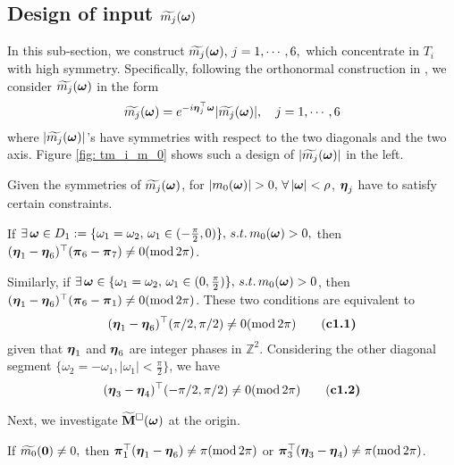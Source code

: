 \subsection{Design of input $\widetilde{m_{j}}(\boldsymbol{\omega})$}\label{sec: phase-design}
In this sub-section, we construct $\widetilde{m_{j}}(\boldsymbol{\omega}),\, j = 1,\cdots,6,$ which concentrate in $T_i$ with high symmetry.
Specifically, following the orthonormal construction in \cite{yin2014orthshear}, we consider $\widetilde{m_{j}}(\boldsymbol{\omega})$ in the form 
\begin{align}\label{eq: m-form}
\widetilde{m_{j}}(\boldsymbol{\omega}) = e^{-i\boldsymbol{\eta}_j^\top\boldsymbol{\omega}}|\widetilde{m_{j}}(\boldsymbol{\omega})|,\quad j = 1,\cdots,6
\end{align}
 where $|\widetilde{m_{j}}(\boldsymbol{\omega})|$'s have symmetries with respect to the two diagonals and the two axis. Figure \ref{fig: tm_i_m_0} shows such a design of $|\widetilde{m_{j}}(\boldsymbol{\omega})|$ in the left.
 
Given the symmetries of $\widetilde{m_{j}}(\boldsymbol{\omega})$, for $|m_0(\boldsymbol{\omega})| > 0,\, \forall\, |\boldsymbol{\omega}| < \rho$, $\boldsymbol{\eta}_j$ have to satisfy certain constraints.
 
\begin{lemma}\label{lem: phase-ineq}
If $\exists\,\boldsymbol{\omega}\in D_1:=\{\omega_1=\omega_2,\,\omega_1\in(-\frac{\pi}{2},0)\},\,s.t. \,m_0(\boldsymbol{\omega})>0,$ then $(\boldsymbol{\eta}_1-\boldsymbol{\eta}_6)^\top (\boldsymbol{\pi}_6-\boldsymbol{\pi}_7)\neq 0(\text{mod}\,2\pi)$. 
\end{lemma} 

Similarly, if $\exists\,\boldsymbol{\omega}\in \{\omega_1 = \omega_2,\, \omega_1\in(0,\frac{\pi}{2})\},\, s.t.\, m_0(\boldsymbol{\omega}) > 0$, then $(\boldsymbol{\eta}_1-\boldsymbol{\eta}_6)^\top (\boldsymbol{\pi}_6-\boldsymbol{\pi}_1)\neq 0(\text{mod}\,2\pi)$. These two conditions are equivalent to 
\begin{align*}
(\boldsymbol{\eta}_1-\boldsymbol{\eta}_6)^\top(\pi/2,\pi/2)\neq 0 (\text{mod}\,2\pi)\tag{\bf c1.1}
\end{align*}
given that $\boldsymbol{\eta}_1$ and $\boldsymbol{\eta}_6$ are integer phases in $\mathbb{Z}^2$.
Considering the other diagonal segment $\{\omega_2 = -\omega_1, |\omega_1| <\frac{\pi}{2}\}$, we have 
\begin{align*}
(\boldsymbol{\eta}_3-\boldsymbol{\eta}_4)^\top(-\pi/2,\pi/2)\neq 0 (\text{mod}\, 2\pi)\tag{\bf c1.2}
\end{align*}

Next, we investigate $\widetilde{\mathbf{M}}^{\Box}(\boldsymbol{\omega})$ at the origin.
\begin{proposition}\label{prop: origin-det}
If $\widetilde{m_0}(\boldsymbol{0})\neq 0,$ then $\boldsymbol{\pi}_1^\top(\boldsymbol{\eta}_1-\boldsymbol{\eta}_6)\neq \pi(\text{mod}\,2\pi)$ or $\boldsymbol{\pi}_3^\top(\boldsymbol{\eta}_3-\boldsymbol{\eta}_4)\neq \pi(\text{mod}\,2\pi)$. 
\end{proposition}

